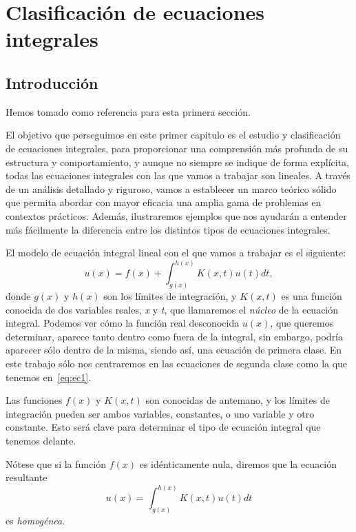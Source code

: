 
\chapter{Clasificación de ecuaciones integrales}\label{ch:primer-capitulo}

\section{Introducción}
Hemos tomado \cite{WazWaz} como referencia para esta primera sección.

El objetivo que perseguimos en este primer capitulo es el estudio y clasificación de ecuaciones integrales, para proporcionar una comprensión más profunda de su estructura y comportamiento, y aunque no siempre se indique de forma explícita, todas las ecuaciones integrales con las que vamos a trabajar son lineales. A través de un análisis detallado y riguroso, vamos a establecer un marco teórico sólido que permita abordar con mayor eficacia una amplia gama de problemas en contextos prácticos. Además, ilustraremos ejemplos que nos ayudarán a entender más fácilmente la diferencia entre los distintos tipos de ecuaciones integrales.

El modelo de ecuación integral lineal con el que vamos a trabajar es el siguiente:
\begin{equation}\label{eq:ec1}
	u(x) = f(x) + \int_{g(x)}^{h(x)} K(x,t)u(t)dt,
\end{equation}
donde $g(x)$ y $h(x)$ son los límites de integración, y $K(x,t)$ es una función conocida de dos variables reales, \textit{x} y \textit{t}, que llamaremos el \textit{núcleo} de la ecuación integral. Podemos ver cómo la función real desconocida $u(x)$, que queremos determinar,  aparece tanto dentro como fuera de la integral, sin embargo, podría aparecer sólo dentro de la misma, siendo así, una ecuación de primera clase. En este trabajo sólo nos centraremos en las ecuaciones de segunda clase como la que tenemos en~\eqref{eq:ec1}.

Las funciones $f(x)$ y $K(x,t)$ son conocidas de antemano, y los límites de integración pueden ser ambos variables, constantes, o uno variable y otro constante. Esto será clave para determinar el tipo de ecuación integral que tenemos delante.\\
\begin{observacion}
	Nótese que si la función $f(x)$ es idénticamente nula, diremos que la ecuación resultante 
	\begin{equation}\label{}
		u(x) = \int_{g(x)}^{h(x)} K(x,t)u(t)dt
	\end{equation}
	es \textit{homogénea}.
\end{observacion}


